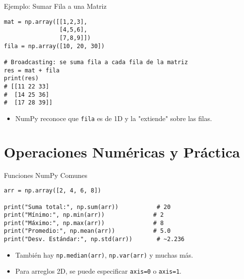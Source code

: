 \documentclass[10pt]{beamer}
\begin{document}
\begin{frame}[fragile]{Ejemplo: Sumar Fila a una Matriz}
\begin{verbatim}
mat = np.array([[1,2,3],
                [4,5,6],
                [7,8,9]])
fila = np.array([10, 20, 30])

# Broadcasting: se suma fila a cada fila de la matriz
res = mat + fila
print(res)
# [[11 22 33]
#  [14 25 36]
#  [17 28 39]]
\end{verbatim}
\begin{itemize}
  \item NumPy reconoce que \texttt{fila} es de 1D y la "extiende" sobre las filas.
\end{itemize}
\end{frame}

\section{Operaciones Numéricas y Práctica}

\begin{frame}[fragile]{Funciones NumPy Comunes}
\begin{verbatim}
arr = np.array([2, 4, 6, 8])

print("Suma total:", np.sum(arr))           # 20
print("Mínimo:", np.min(arr))              # 2
print("Máximo:", np.max(arr))              # 8
print("Promedio:", np.mean(arr))           # 5.0
print("Desv. Estándar:", np.std(arr))       # ~2.236
\end{verbatim}
\begin{itemize}
  \item También hay \texttt{np.median(arr)}, \texttt{np.var(arr)} y muchas más.
  \item Para arreglos 2D, se puede especificar \texttt{axis=0} o \texttt{axis=1}.
\end{itemize}
\end{frame}
\end{document}
